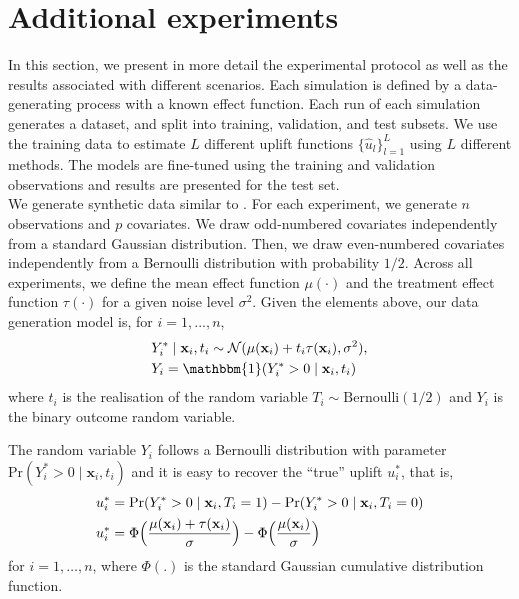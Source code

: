 \documentclass{article}
\def\x{\mathbf x}
\begin{document}
\section{Additional experiments}
\label{sec:appendix_experiments}

In this section, we present in more detail the experimental protocol as well as the results associated with different scenarios. Each simulation is defined by a data-generating process with a known effect function. Each run of each simulation generates a dataset, and split into training, validation, and test subsets. We use the training data to estimate $L$ different uplift functions $\{\hat{u}_l\}_{l=1}^L$ using $L$ different methods. The models are fine-tuned using the training and validation observations and results are presented for the test set.\\


We generate synthetic data similar  to  \cite{powers2018some}. For each experiment, we generate $n$ observations and $p$ covariates. We draw odd-numbered covariates independently from a standard Gaussian distribution. Then, we draw even-numbered covariates independently from a Bernoulli distribution with probability $1/2$. Across all experiments, we define the mean effect function $\mu(\cdot)$ and the treatment effect function $\tau(\cdot)$ for a given noise level $\sigma^2$. Given the elements above, our data generation model is, for $i=1,...,n$,
\begin{align*}
    &Y_i^* \mid \x_i, t_i \sim \mathcal{N}(\mu(\x_i) + t_i\tau(\x_i), \sigma^2),\\
    &Y_i = \mathbbm{1}(Y_i^* > 0 \mid \x_i, t_i)
\end{align*}
where $t_i$ is the realisation of the random variable $T_i \sim \mathrm{Bernoulli}(1/2)$ and $Y_i$ is the binary outcome random variable. 

The random variable $Y_i$ follows a Bernoulli distribution with parameter $\mathrm{Pr}(Y_i^* > 0 \mid \x_i, t_i)$ and it is easy to recover the ``true'' uplift $u_i^*$, that is,
\begin{align}
    u_i^* &= \mathrm{Pr}(Y_i^* > 0 \mid \x_i, T_i = 1) - \mathrm{Pr}(Y_i^* > 0 \mid \x_i, T_i = 0) \nonumber \\
    u_i^* &= \Phi \Bigl( \frac{\mu(\x_i) + \tau(\x_i)}{\sigma} \Bigr) - \Phi \Big( \frac{\mu(\x_i)}{\sigma} \Big) \label{eq:sim_true_uplift}
\end{align}
for $i=1,\ldots,n$, where $\Phi(.)$ is the standard Gaussian cumulative distribution function.\\
\end{document}
